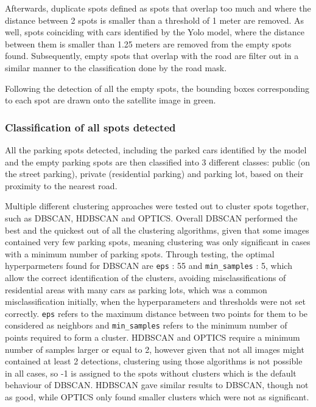 Afterwards, duplicate spots defined as spots that overlap too much and where the distance between 2 spots is smaller than a threshold of 1 meter are removed.
As well, spots coinciding with cars identified by the Yolo model, where the distance between them is smaller than 1.25 meters are removed from the empty spots found.
Subsequently, empty spots that overlap with the road are filter out in a similar manner to the classification done by the road mask.

Following the detection of all the empty spots, the bounding boxes corresponding to each spot are drawn onto the satellite image in green.

\subsubsection{Classification of all spots detected}
All the parking spots detected, including the parked cars identified by the model and the empty parking spots are then classified into 3 different classes: public (on the street parking), private (residential parking) and parking lot, based on their proximity to the nearest road.

Multiple different clustering approaches were tested out to cluster spots together, such as DBSCAN, HDBSCAN and OPTICS.
Overall DBSCAN performed the best and the quickest out of all the clustering algorithms, given that some images contained very few parking spots, meaning clustering was only significant in cases with a minimum number of parking spots.
Through testing, the optimal hyperparmeters found for DBSCAN are \texttt{eps} : 55 and \texttt{min\_samples} : 5, which allow the correct identification of the clusters, avoiding misclassifications of residential areas with many cars as parking lots, which was a common misclassification initially, when the hyperparameters and thresholds were not set correctly.
\texttt{eps} refers to the maximum distance between two points for them to be considered as neighbors and \texttt{min\_samples} refers to the minimum number of points required to form a cluster.
HDBSCAN and OPTICS require a minimum number of samples larger or equal to 2, however given that not all images might contained at least 2 detections, clustering using those algorithms is not possible in all cases, so -1 is assigned to the spots without clusters which is the default behaviour of DBSCAN.
HDBSCAN gave similar results to DBSCAN, though not as good, while OPTICS only found smaller clusters which were not as significant.

